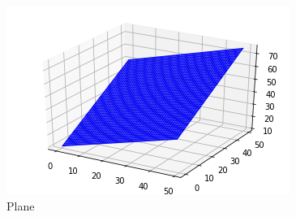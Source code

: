 \documentclass[journal,12pt,twocolumn]{IEEEtran}
\begin{document}
\begin{figure}[h!]
	\centering
	\includegraphics[width=\columnwidth]{plane.png}
	\caption{Plane}
	\label{myfig2}
\end{figure}
\end{document}
